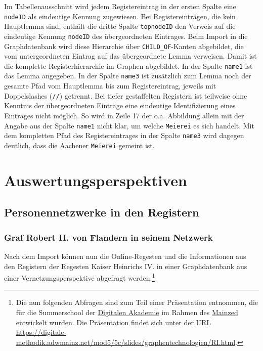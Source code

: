 \documentclass[ngerman,]{scrreprt}
\begin{document}
Im Tabellenausschnitt wird jedem Registereintrag in der ersten Spalte eine \texttt{nodeID} als eindeutige Kennung zugewiesen. Bei Registereinträgen, die kein Hauptlemma sind, enthält die dritte Spalte \texttt{topnodeID} den Verweis auf die eindeutige Kennung \texttt{nodeID} des übergeordneten Eintrages. Beim Import in die Graphdatenbank wird diese Hierarchie über \texttt{CHILD\_OF}-Kanten abgebildet, die vom untergeordneten Eintrag auf das übergeordnete Lemma verweisen. Damit ist die komplette Registerhierarchie im Graphen abgebildet. In der Spalte \texttt{name1} ist das Lemma angegeben. In der Spalte \texttt{name3} ist zusätzlich zum Lemma noch der gesamte Pfad vom Hauptlemma bis zum Registereintrag, jeweils mit Doppelslashes (\texttt{//}) getrennt. Bei tiefer gestaffelten Registern ist teilweise ohne Kenntnis der übergeordneten Einträge eine eindeutige Identifizierung eines Eintrages nicht möglich. So wird in Zeile 17 der o.a. Abbildung allein mit der Angabe aus der Spalte \texttt{name1} nicht klar, um welche \texttt{Meierei} es sich handelt. Mit dem kompletten Pfad des Registereintrages in der Spalte \texttt{name3} wird dagegen deutlich, dass die Aachener \texttt{Meierei} gemeint ist.

\hypertarget{auswertungsperspektiven}{%
\section{Auswertungsperspektiven}\label{auswertungsperspektiven}}

\hypertarget{personennetzwerke-in-den-registern}{%
\subsection{Personennetzwerke in den Registern}\label{personennetzwerke-in-den-registern}}

\hypertarget{graf-robert-ii.-von-flandern-in-seinem-netzwerk}{%
\subsubsection{Graf Robert II. von Flandern in seinem Netzwerk}\label{graf-robert-ii.-von-flandern-in-seinem-netzwerk}}

Nach dem Import können nun die Online-Regesten und die Informationen aus den Registern der Regesten Kaiser Heinrichs IV. in einer Graphdatenbank aus einer Vernetzungsperspektive abgefragt werden.\footnote{Die nun folgenden Abfragen sind zum Teil einer Präsentation entnommen, die für die Summerschool der \href{https://www.digitale-akademie.de}{Digitalen Akademie} im Rahmen des \href{https://www.mainzed.org/de}{Mainzed} entwickelt wurden. Die Präsentation findet sich unter der URL \url{https://digitale-methodik.adwmainz.net/mod5/5c/slides/graphentechnologien/RI.html}.}
\end{document}
